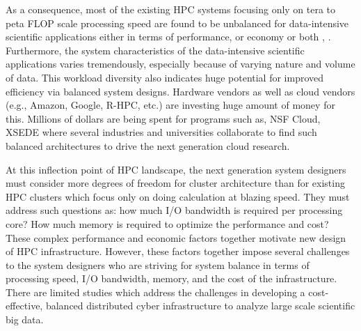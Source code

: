 \documentclass[journal]{IEEEtran}
\begin{document}

As a consequence, most of the existing HPC systems focusing only on tera to peta FLOP scale processing speed are found to be unbalanced for data-intensive scientific applications either in terms of performance, or economy or both \cite{}, \cite{}. Furthermore, the system characteristics of the data-intensive scientific applications varies tremendously, especially because of varying nature and volume of data. This workload diversity also indicates huge potential for improved efficiency via balanced system designs.  Hardware vendors as well as cloud vendors (e.g., Amazon, Google, R-HPC, etc.) are investing huge amount of money for this. Millions of dollars are being spent for programs such as, NSF Cloud, XSEDE where several industries and universities collaborate to find such balanced architectures to drive the next generation cloud research. 

At this inflection point of HPC landscape, the next generation system designers must consider more degrees of freedom for cluster architecture than for existing HPC clusters which focus only on doing calculation at blazing speed. They must address such questions as: how much I/O bandwidth is required per processing core? How much memory is required to optimize the performance and cost? These complex performance and economic factors together motivate new design of HPC infrastructure. However, these factors together impose several challenges to the system designers who are striving for system balance in terms of processing speed, I/O bandwidth, memory, and the cost of the infrastructure. There are limited studies which address the challenges in developing a cost-effective, balanced distributed cyber infrastructure to analyze large scale scientific big data. 
 
\end{document}

